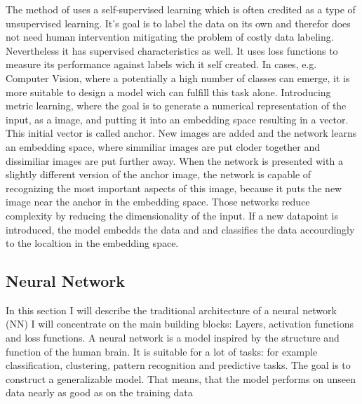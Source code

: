 The method of \citet{shenkar2022anomaly} uses a self-supervised learning which is often credited as a type of unsupervised learning.
It's goal is to label the data on its own and therefor does not need human intervention mitigating the problem of costly data labeling.
Nevertheless it has supervised characteristics as well.
It uses loss functions to measure its performance against labels wich it self created.
In cases, e.g. Computer Vision, where a potentially a high number of classes can emerge, it is more suitable to design a model wich can fulfill this task alone. 
Introducing metric learning, where the goal is to generate a numerical representation of the input, as a image, and putting it into an embedding space resulting in a vector.
This initial vector is called anchor. New images are added and the network learns an embedding space, where simmiliar images are put cloder together and dissimiliar 
images are put further away. When the network is presented with a slightly different version of the anchor image, the network is capable of recognizing the most important 
aspects of this image, because it puts the new image near the anchor in the embedding space.  
Those networks reduce complexity by reducing the dimensionality of the input.
If a new datapoint is introduced, the model embedds the data and and classifies the data accourdingly to the localtion in the embedding space. 
\citep{raina2007self}


\subsection{Neural Network}
In this section I will describe the traditional architecture of a neural network (NN)
I will concentrate on the main building blocks: Layers, activation functions and loss functions. 
A neural network is a model inspired by the structure and function of the human brain. 
It is suitable for a lot of tasks: for example classification, clustering, pattern recognition and predictive tasks.
The goal is to construct a generalizable model.
That means, that the model performs on unseen data nearly as good as on the training data 


